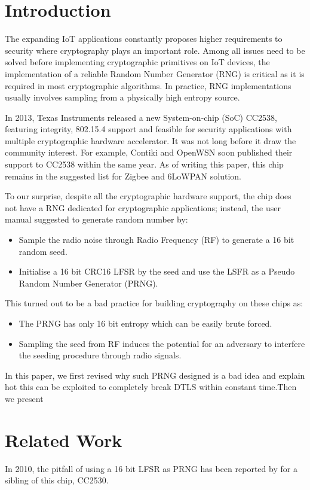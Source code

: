 \section{Introduction}

The expanding IoT applications constantly proposes higher requirements to security where cryptography plays an important role. Among all issues need to be solved before implementing cryptographic primitives on IoT devices, the implementation of a reliable Random Number Generator (RNG) is critical as it is required in most cryptographic algorithms. In practice, RNG implementations usually involves sampling from a physically high entropy source.

In 2013, Texas Instruments released a new System-on-chip (SoC)  CC2538\cite{CC2538}, featuring integrity, 802.15.4 support and feasible for security applications with multiple cryptographic hardware accelerator. It was not long before it draw the community interest. For example, Contiki and OpenWSN soon published their support to CC2538 within the same year. As of writing this paper, this chip remains in the suggested list for Zigbee and 6LoWPAN solution.

To our surprise, despite all the cryptographic hardware support, the chip does not have a RNG dedicated for cryptographic applications; instead, the user manual suggested to generate random number by:
\begin{itemize}
	\item Sample the radio noise through Radio Frequency (RF) to generate a 16 bit random seed.
	\item Initialise a 16 bit CRC16 LFSR by the seed and use the LSFR as a Pseudo Random Number Generator (PRNG).
\end{itemize}

This turned out to be a bad practice for building cryptography on these chips as:
\begin{itemize}
	\item The PRNG has only 16 bit entropy which can be easily brute forced.
	\item Sampling the seed from RF induces the potential for an adversary to interfere the seeding procedure through radio signals.
\end{itemize}

In this paper, we first revised why such PRNG designed is a bad idea and explain hot this can be exploited to completely break DTLS within constant time.Then we present 


\section{Related Work}
In 2010, the pitfall of using a 16 bit LFSR as PRNG has been reported by \cite{SmartMeterBlog}\cite{CC2530PRNG} for a sibling of this chip, CC2530. 